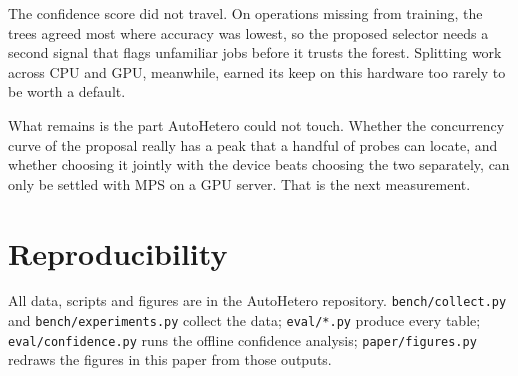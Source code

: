 \documentclass[conference]{IEEEtran}
\begin{document}
The confidence score did not travel. On operations missing from training, the trees agreed most where accuracy was lowest, so the proposed selector needs a second signal that flags unfamiliar jobs before it trusts the forest. Splitting work across CPU and GPU, meanwhile, earned its keep on this hardware too rarely to be worth a default.

What remains is the part AutoHetero could not touch. Whether the concurrency curve of the proposal really has a peak that a handful of probes can locate, and whether choosing it jointly with the device beats choosing the two separately, can only be settled with MPS on a GPU server. That is the next measurement.

\section*{Reproducibility}
All data, scripts and figures are in the AutoHetero repository. \texttt{bench/collect.py} and \texttt{bench/experiments.py} collect the data; \texttt{eval/*.py} produce every table; \texttt{eval/confidence.py} runs the offline confidence analysis; \texttt{paper/figures.py} redraws the figures in this paper from those outputs.
\end{document}
